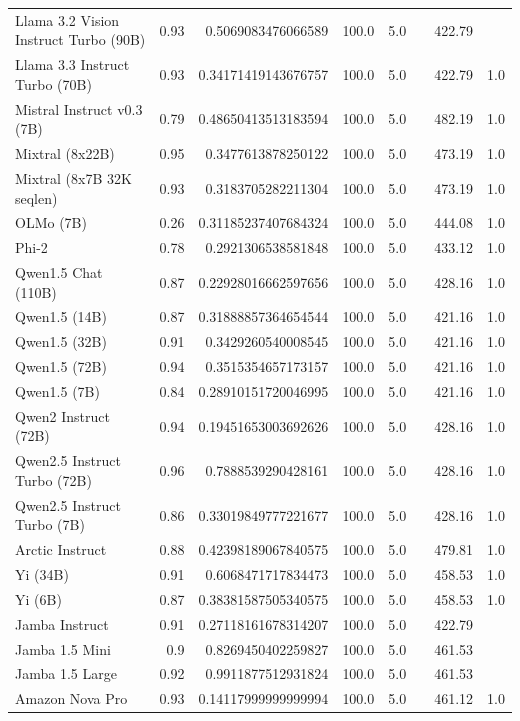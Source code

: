 \begin{table}[htp]
{\begin{tabular}{lrrrrrrr}
Llama 3.2 Vision Instruct Turbo (90B) & 0.93 & 0.5069083476066589 & 100.0 & 5.0 &  & 422.79 &  \\
Llama 3.3 Instruct Turbo (70B) & 0.93 & 0.34171419143676757 & 100.0 & 5.0 &  & 422.79 & 1.0 \\
Mistral Instruct v0.3 (7B) & 0.79 & 0.48650413513183594 & 100.0 & 5.0 &  & 482.19 & 1.0 \\
Mixtral (8x22B) & 0.95 & 0.3477613878250122 & 100.0 & 5.0 &  & 473.19 & 1.0 \\
Mixtral (8x7B 32K seqlen) & 0.93 & 0.3183705282211304 & 100.0 & 5.0 &  & 473.19 & 1.0 \\
OLMo (7B) & 0.26 & 0.31185237407684324 & 100.0 & 5.0 &  & 444.08 & 1.0 \\
Phi-2 & 0.78 & 0.2921306538581848 & 100.0 & 5.0 &  & 433.12 & 1.0 \\
Qwen1.5 Chat (110B) & 0.87 & 0.22928016662597656 & 100.0 & 5.0 &  & 428.16 & 1.0 \\
Qwen1.5 (14B) & 0.87 & 0.31888857364654544 & 100.0 & 5.0 &  & 421.16 & 1.0 \\
Qwen1.5 (32B) & 0.91 & 0.3429260540008545 & 100.0 & 5.0 &  & 421.16 & 1.0 \\
Qwen1.5 (72B) & 0.94 & 0.3515354657173157 & 100.0 & 5.0 &  & 421.16 & 1.0 \\
Qwen1.5 (7B) & 0.84 & 0.28910151720046995 & 100.0 & 5.0 &  & 421.16 & 1.0 \\
Qwen2 Instruct (72B) & 0.94 & 0.19451653003692626 & 100.0 & 5.0 &  & 428.16 & 1.0 \\
Qwen2.5 Instruct Turbo (72B) & 0.96 & 0.7888539290428161 & 100.0 & 5.0 &  & 428.16 & 1.0 \\
Qwen2.5 Instruct Turbo (7B) & 0.86 & 0.33019849777221677 & 100.0 & 5.0 &  & 428.16 & 1.0 \\
Arctic Instruct & 0.88 & 0.42398189067840575 & 100.0 & 5.0 &  & 479.81 & 1.0 \\
Yi (34B) & 0.91 & 0.6068471717834473 & 100.0 & 5.0 &  & 458.53 & 1.0 \\
Yi (6B) & 0.87 & 0.38381587505340575 & 100.0 & 5.0 &  & 458.53 & 1.0 \\
Jamba Instruct & 0.91 & 0.27118161678314207 & 100.0 & 5.0 &  & 422.79 &  \\
Jamba 1.5 Mini & 0.9 & 0.8269450402259827 & 100.0 & 5.0 &  & 461.53 &  \\
Jamba 1.5 Large & 0.92 & 0.9911877512931824 & 100.0 & 5.0 &  & 461.53 &  \\
Amazon Nova Pro & 0.93 & 0.14117999999999994 & 100.0 & 5.0 &  & 461.12 & 1.0 \\

\end{tabular}}
\end{table}
